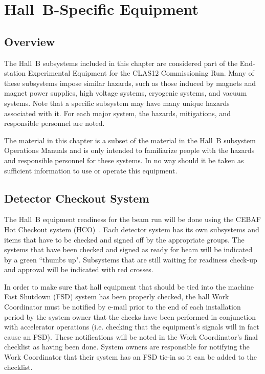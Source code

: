 \documentclass[11pt]{report}
\begin{document}
\chapter{Hall~B-Specific Equipment}

\section{Overview}

The Hall~B subsystems included in this chapter are considered part of the End-station 
Experimental Equipment for the CLAS12 Commissioning Run. Many of these subsystems impose 
similar hazards, such as those induced by magnets and magnet power supplies, high voltage 
systems, cryogenic systems, and vacuum systems. Note that a specific subsystem may have 
many unique hazards associated with it. For each major system, the hazards, mitigations, 
and responsible personnel are noted.

The material in this chapter is a subset of the material in the Hall~B subsystem Operations 
Manuals and is only intended to familiarize people with the hazards and responsible personnel 
for these systems. In no way should it be taken as sufficient information to use or operate 
this equipment.

\section{Detector Checkout System}

The Hall~B equipment readiness for the beam run will be done using the CEBAF Hot Checkout 
system (HCO)~\cite{hco}. Each detector system has its own subsystems and items that have 
to be checked and signed off by the appropriate groups. The systems that have been checked 
and signed as ready for beam will be indicated by a green ``thumbs up". Subsystems that are 
still waiting for readiness check-up and approval will be indicated with red crosses. 

In order to make sure that hall equipment that should be tied into the machine Fast Shutdown 
(FSD) system has been properly checked, the hall Work Coordinator must be notified by e-mail 
prior to the end of each installation period by the system owner that the checks have been 
performed in conjunction with accelerator operations (i.e. checking that the equipment's 
signals will in fact cause an FSD). These notifications will be noted in the Work Coordinator's 
final checklist as having been done. System owners are responsible for notifying the Work 
Coordinator that their system has an FSD tie-in so it can be added to the checklist.
\end{document}

